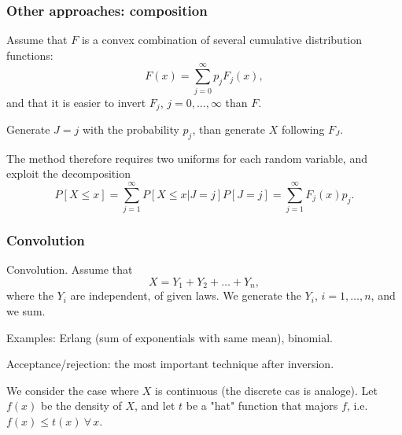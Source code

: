 \documentclass{beamer}
\begin{document}
	\begin{frame}
		\frametitle{Other approaches: composition}
		
		Assume that $F$ is a convex combination of several cumulative
		distribution functions:
		\[
		F (x) = \sum_{j = 0}^{\infty} p_j F_j (x),
		\]
		and that it is easier to invert $F_j$, $j = 0,\ldots,\infty$ than $F$.
		
		\mbox{}
		
		Generate $J = j$ with the probability $p_j$, than generate $X$
		following $F_J$.
		
		\mbox{}
		
		The method therefore requires two uniforms for each random variable,
		and exploit the decomposition
		\[
		P[ X \leq x ] = \sum_{j = 1}^{\infty} P[ X \leq x | J = j] P[J = j] = \sum_{j = 1}^{\infty} F_j(x)p_j.
		\]
		
	\end{frame}
	
	\begin{frame}
		\frametitle{Convolution}
		
		{\red Convolution}. Assume that
		\[
		X = Y_1 + Y_2 + \ldots + Y_n,
		\]
		where the $Y_i$ are independent, of given laws.
		We generate the $Y_i$, $i = 1,\ldots,n$, and we sum.
		
		\mbox{}
		
		Examples: Erlang (sum of exponentials with same mean), binomial.
		
		\mbox{}
		
		\mbox{}
		
		{\red Acceptance/rejection}: the most important technique after inversion.
		
		\mbox{}
		
		We consider the case where $X$ is continuous (the discrete cas is
		analoge).
		Let $f(x)$ be the density of $X$, and let $t$ be a "hat" function that
		majors $f$, i.e. $f (x) \leq t(x)\ \forall\, x$.
		
	\end{frame}
	
\end{document}
